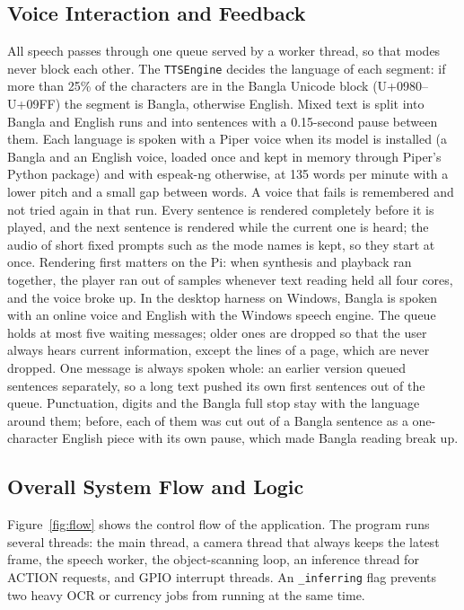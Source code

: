 \subsection{Voice Interaction and Feedback}
All speech passes through one queue served by a worker thread, so that modes never block each other. The \texttt{TTSEngine} decides the language of each segment: if more than 25\% of the characters are in the Bangla Unicode block (U+0980--U+09FF) the segment is Bangla, otherwise English. Mixed text is split into Bangla and English runs and into sentences with a 0.15-second pause between them. Each language is spoken with a Piper voice \cite{piper} when its model is installed (a Bangla and an English voice, loaded once and kept in memory through Piper's Python package) and with espeak-ng \cite{espeakng} otherwise, at 135 words per minute with a lower pitch and a small gap between words. A voice that fails is remembered and not tried again in that run. Every sentence is rendered completely before it is played, and the next sentence is rendered while the current one is heard; the audio of short fixed prompts such as the mode names is kept, so they start at once. Rendering first matters on the Pi: when synthesis and playback ran together, the player ran out of samples whenever text reading held all four cores, and the voice broke up. In the desktop harness on Windows, Bangla is spoken with an online voice and English with the Windows speech engine. The queue holds at most five waiting messages; older ones are dropped so that the user always hears current information, except the lines of a page, which are never dropped. One message is always spoken whole: an earlier version queued sentences separately, so a long text pushed its own first sentences out of the queue. Punctuation, digits and the Bangla full stop stay with the language around them; before, each of them was cut out of a Bangla sentence as a one-character English piece with its own pause, which made Bangla reading break up.

\subsection{Overall System Flow and Logic}
Figure~\ref{fig:flow} shows the control flow of the application. The program runs several threads: the main thread, a camera thread that always keeps the latest frame, the speech worker, the object-scanning loop, an inference thread for ACTION requests, and GPIO interrupt threads. An \texttt{\_inferring} flag prevents two heavy OCR or currency jobs from running at the same time.


